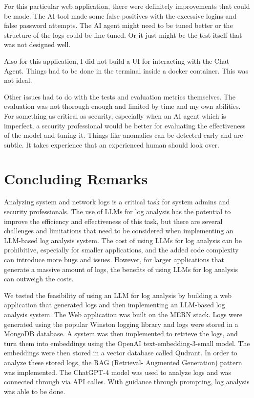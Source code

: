 \documentclass[sigconf]{acmart}
\begin{document}
For this particular web application, there were definitely improvements that could be made. The AI tool made some false positives with the excessive logins and false password attempts. The AI agent might need to be tuned better or the structure of the logs could be fine-tuned. Or it just might be the test itself that was not designed well.

Also for this application, I did not build a UI for interacting with the Chat Agent. Things had to be done in the terminal inside a docker container. This was not ideal.

Other issues had to do with the tests and evaluation metrics themselves. The evaluation was not thorough enough and limited by time and my own abilities. For something as critical as security, especially when an AI agent which is imperfect, a security professional would be better for evaluating the effectiveness of the model and tuning it. Things like anomalies can be detected early and are subtle. It takes experience that an experienced human should look over. 

\section{Concluding Remarks}

Analyzing system and network logs is a critical task for system admins and security professionals. The use of LLMs for log analysis has the potential to improve the efficiency and effectiveness of this task, but there are several challenges and limitations that need to be considered when implementing an LLM-based log analysis system. The cost of using LLMs for log analysis can be prohibitive, especially for smaller applications, and the added code complexity can introduce more bugs and issues. However, for larger applications that generate a massive amount of logs, the benefits of using LLMs for log analysis can outweigh the costs.

We tested the feasibility of using an LLM for log analysis by building a web application that generated logs and then implementing an LLM-based log analysis system. The Web application was built on the MERN stack. Logs were generated using the popular Winston logging library and logs were stored in a MongoDB database. A system was then implemented to retrieve the logs, and turn them into embeddings using the OpenAI text-embedding-3-small model. The embeddings were then stored in a vector database called Qudrant. In order to analyze these stored logs, the RAG (Retrieval-
Augmented Generation) pattern was implemented. The ChatGPT-4 model was used to analyze logs and was connected through via API calles. With guidance through prompting, log analysis was able to be done.
\end{document}
